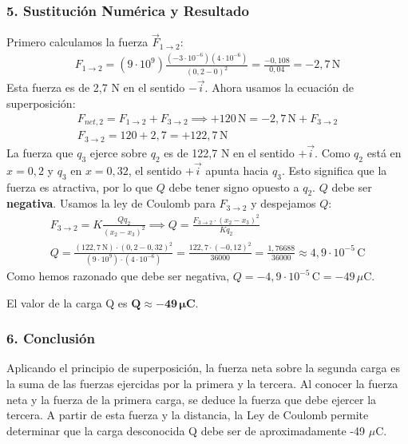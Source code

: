 \subsubsection*{5. Sustitución Numérica y Resultado}
Primero calculamos la fuerza $\vec{F}_{1 \to 2}$:
\begin{gather}
    F_{1 \to 2} = (9\cdot 10^9) \frac{(-3\cdot 10^{-6})(4\cdot 10^{-6})}{(0,2-0)^2} = \frac{-0,108}{0,04} = -2,7 \, \text{N}
\end{gather}
Esta fuerza es de 2,7 N en el sentido $-\vec{i}$. Ahora usamos la ecuación de superposición:
\begin{gather}
    F_{net,2} = F_{1 \to 2} + F_{3 \to 2} \implies +120 \, \text{N} = -2,7 \, \text{N} + F_{3 \to 2} \nonumber \\
    F_{3 \to 2} = 120 + 2,7 = +122,7 \, \text{N}
\end{gather}
La fuerza que $q_3$ ejerce sobre $q_2$ es de 122,7 N en el sentido $+\vec{i}$. Como $q_2$ está en $x=0,2$ y $q_3$ en $x=0,32$, el sentido $+\vec{i}$ apunta hacia $q_3$. Esto significa que la fuerza es atractiva, por lo que $Q$ debe tener signo opuesto a $q_2$. $Q$ debe ser \textbf{negativa}.
Usamos la ley de Coulomb para $F_{3 \to 2}$ y despejamos $Q$:
\begin{gather}
    F_{3 \to 2} = K \frac{Q q_2}{(x_2-x_3)^2} \implies Q = \frac{F_{3 \to 2} \cdot (x_2-x_3)^2}{K q_2} \nonumber \\
    Q = \frac{(122,7 \, \text{N}) \cdot (0,2 - 0,32)^2}{(9\cdot 10^9) \cdot (4\cdot 10^{-6})} = \frac{122,7 \cdot (-0,12)^2}{36000} = \frac{1,76688}{36000} \approx 4,9 \cdot 10^{-5} \, \text{C}
\end{gather}
Como hemos razonado que debe ser negativa, $Q = -4,9 \cdot 10^{-5} \, \text{C} = -49 \, \mu\text{C}$.
\begin{cajaresultado}
    El valor de la carga Q es $\boldsymbol{Q \approx -49 \, \mu\textbf{C}}$.
\end{cajaresultado}

\subsubsection*{6. Conclusión}
\begin{cajaconclusion}
Aplicando el principio de superposición, la fuerza neta sobre la segunda carga es la suma de las fuerzas ejercidas por la primera y la tercera. Al conocer la fuerza neta y la fuerza de la primera carga, se deduce la fuerza que debe ejercer la tercera. A partir de esta fuerza y la distancia, la Ley de Coulomb permite determinar que la carga desconocida Q debe ser de aproximadamente -49 $\mu$C.
\end{cajaconclusion}

